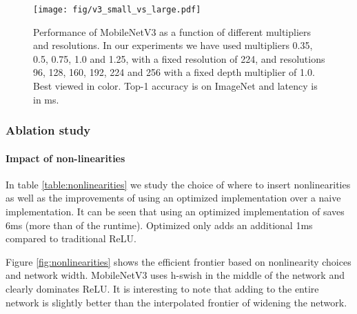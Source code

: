 \documentclass[10pt,twocolumn,letterpaper]{article}
\begin{document}
\begin{figure}[t!]
    \centering
    \texttt{[image: fig/v3\_small\_vs\_large.pdf]}
    \caption{Performance of MobileNetV3 as a function of different multipliers and resolutions. In our experiments we have used
    multipliers 0.35, 0.5, 0.75, 1.0 and 1.25, with a fixed resolution of 224, 
    and resolutions 96, 128, 160, 192, 224 and 256 with a fixed depth multiplier of 1.0. Best viewed in color. Top-1 accuracy is on ImageNet and latency is in ms.}
    \label{fig:resolution-vs-latency}
\end{figure}



\subsubsection{Ablation study}
\paragraph{Impact of non-linearities} In table \ref{table:nonlinearities} we study the choice of where to insert  nonlinearities as well as the improvements of using an optimized implementation over a naive implementation. It can be seen that using an optimized implementation of  saves 6ms (more than  of the runtime). Optimized  only adds an additional 1ms compared to traditional ReLU. 

Figure \ref{fig:nonlinearities} 
shows the efficient frontier based on nonlinearity choices and network width. MobileNetV3 uses h-swish in the middle of the network and clearly dominates ReLU. It is interesting to note that adding  to the entire network is slightly better than the interpolated frontier of widening the network.
\end{document}
